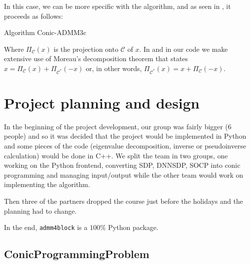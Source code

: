 \documentclass[paper=a4, fontsize=11pt]{scrartcl}
\numberwithin{equation}{section}		%
\numberwithin{figure}{section}			%
\numberwithin{table}{section}				%
\begin{document}
In this case, we can be more specific with the algorithm, and as seen in \cite{sun2014}, it proceeds as follows:
\begin{algorithm}
	\caption{Algorithm Conic-ADMM3c}
\end{algorithm}

Where $\Pi_\mathcal{C}(x)$ is the projection onto $\mathcal{C}$ of $x$. In \cite{sun2014} and in our code we make extensive use of Moreau's decomposition theorem that states $x = \Pi_{\mathcal{C}}(x)+ \Pi_{\mathcal{C}^*}(-x)$ or, in other words, $\Pi_{\mathcal{C}^*}(x) = x + \Pi_{\mathcal{C}}(-x)$.

\section{Project planning and design}

In the beginning of the project development, our group was fairly bigger (6 people) and so it was decided that the project would be implemented in Python and some pieces of the code (eigenvalue decomposition, inverse or pseudoinverse calculation) would be done in C++. We split the team in two groups, one working on the Python frontend, converting SDP, DNNSDP, SOCP into conic programming and managing input/output while the other team would work on implementing the algorithm.

Then three of the partners dropped the course just before the holidays and the planning had to change.

In the end, \texttt{admm4block} is a $100\%$ Python package. 

\subsection{ConicProgrammingProblem}
\end{document}
